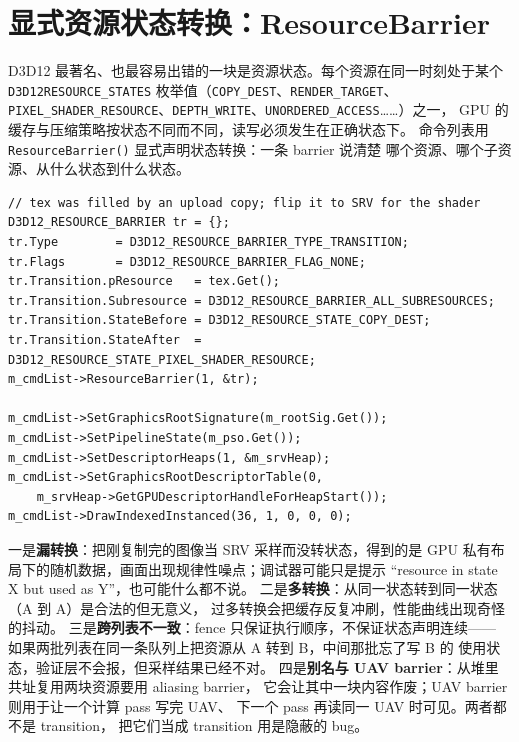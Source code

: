 \documentclass[12pt,a4paper,fontset=fandol]{ctexbook}
\newcommand{\Fn}[1]{\texttt{#1()}}
\newcommand{\Tp}[1]{\texttt{#1}}
\newcommand{\Bk}{\discretionary{}{}{}}
\newcommand{\Lang}[1]{\textsf{#1}}
\newcommand{\DomGPU}{\Lang{GPU}}
\begin{document}
\section{显式资源状态转换：ResourceBarrier}

D3D12 最著名、也最容易出错的一块是资源状态。每个资源在同一时刻处于某个
\Tp{D3D12\Bk RESOURCE\_STATES} 枚举值（\Tp{COPY\_DEST}、\Tp{RENDER\_TARGET}、
\Tp{PIXEL\_SHADER\_RESOURCE}、\Tp{DEPTH\_WRITE}、\Tp{UNORDERED\_ACCESS}……）之一，
\DomGPU{} 的缓存与压缩策略按状态不同而不同，读写必须发生在正确状态下。
命令列表用 \Fn{Resource\Bk Barrier} 显式声明状态转换：一条 barrier 说清楚
哪个资源、哪个子资源、从什么状态到什么状态。

\begin{lstlisting}[style=cppstyle,caption={D3D12 的资源转换与描述符绑定},label={lst:ch10-d3d12-barrier}]
// tex was filled by an upload copy; flip it to SRV for the shader
D3D12_RESOURCE_BARRIER tr = {};
tr.Type        = D3D12_RESOURCE_BARRIER_TYPE_TRANSITION;
tr.Flags       = D3D12_RESOURCE_BARRIER_FLAG_NONE;
tr.Transition.pResource   = tex.Get();
tr.Transition.Subresource = D3D12_RESOURCE_BARRIER_ALL_SUBRESOURCES;
tr.Transition.StateBefore = D3D12_RESOURCE_STATE_COPY_DEST;
tr.Transition.StateAfter  = D3D12_RESOURCE_STATE_PIXEL_SHADER_RESOURCE;
m_cmdList->ResourceBarrier(1, &tr);

m_cmdList->SetGraphicsRootSignature(m_rootSig.Get());
m_cmdList->SetPipelineState(m_pso.Get());
m_cmdList->SetDescriptorHeaps(1, &m_srvHeap);
m_cmdList->SetGraphicsRootDescriptorTable(0,
    m_srvHeap->GetGPUDescriptorHandleForHeapStart());
m_cmdList->DrawIndexedInstanced(36, 1, 0, 0, 0);
\end{lstlisting}

\begin{warning}[title={状态转换为什么成为头号错误源}]
一是\textbf{漏转换}：把刚复制完的图像当 SRV 采样而没转状态，得到的是
\DomGPU{} 私有布局下的随机数据，画面出现规律性噪点；调试器可能只是提示
``resource in state X but used as Y''，也可能什么都不说。
二是\textbf{多转换}：从同一状态转到同一状态（A 到 A）是合法的但无意义，
过多转换会把缓存反复冲刷，性能曲线出现奇怪的抖动。
三是\textbf{跨列表不一致}：fence 只保证执行顺序，不保证状态声明连续——
如果两批列表在同一条队列上把资源从 A 转到 B，中间那批忘了写 B 的
使用状态，验证层不会报，但采样结果已经不对。
四是\textbf{别名与 UAV barrier}：从堆里共址复用两块资源要用 aliasing barrier，
它会让其中一块内容作废；UAV barrier 则用于让一个计算 pass 写完 UAV、
下一个 pass 再读同一 UAV 时可见。两者都不是 transition，
把它们当成 transition 用是隐蔽的 bug。
\end{warning}
\end{document}
